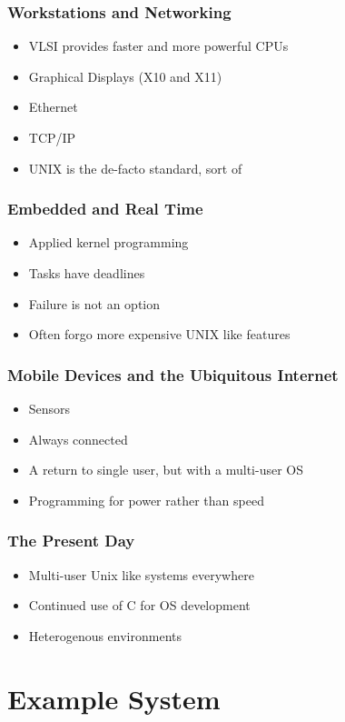 \documentclass[pdftex]{beamer} %
\begin{document}
\begin{frame}
  \frametitle{Workstations and Networking}
  \begin{itemize}
  \item VLSI provides faster and more powerful CPUs
  \item Graphical Displays (X10 and X11)
  \item Ethernet
  \item TCP/IP
  \item UNIX is the de-facto standard, sort of
  \end{itemize}
\end{frame}

\begin{frame}
  \frametitle{Embedded and Real Time}
  \begin{itemize}
  \item Applied kernel programming
  \item Tasks have deadlines
  \item Failure is not an option
  \item Often forgo more expensive UNIX like features
  \end{itemize}
\end{frame}

\begin{frame}
  \frametitle{Mobile Devices and the Ubiquitous Internet}
  \begin{itemize}
  \item Sensors
  \item Always connected
  \item A return to single user, but with a multi-user OS
  \item Programming for power rather than speed
  \end{itemize}
\end{frame}

\begin{frame}
  \frametitle{The Present Day}
  \begin{itemize}
  \item Multi-user Unix like systems everywhere
  \item Continued use of C for OS development
  \item Heterogenous environments
  \end{itemize}
\end{frame}

\section{Example System}
\label{sec:example-system}
\end{document}
